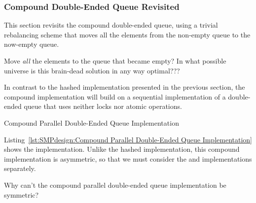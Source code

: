 \subsubsection{Compound Double-Ended Queue Revisited}
\label{sec:SMPdesign:Compound Double-Ended Queue Revisited}

This section revisits the compound double-ended queue, using a trivial
rebalancing scheme that moves all the elements from the non-empty
queue to the now-empty queue.

\QuickQuiz{}
	Move \emph{all} the elements to the queue that became empty?
	In what possible universe is this brain-dead solution in any
	way optimal???
 \QuickQuizEnd

In contrast to the hashed implementation presented in
the previous section, the compound implementation will build on
a sequential implementation of a double-ended queue that uses
neither locks nor atomic operations.

\begin{listing}[tbp]

\caption{Compound Parallel Double-Ended Queue Implementation}
\label{lst:SMPdesign:Compound Parallel Double-Ended Queue Implementation}
\end{listing}

Listing~\ref{lst:SMPdesign:Compound Parallel Double-Ended Queue Implementation}
shows the implementation.
Unlike the hashed implementation, this compound implementation is
asymmetric, so that we must consider the 
and  implementations separately.

\QuickQuiz{}
	Why can't the compound parallel double-ended queue
	implementation be symmetric?
 \QuickQuizEnd

